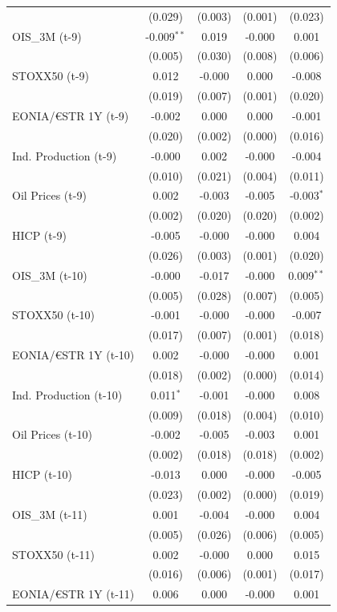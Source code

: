 \begin{longtable}[t]{lcccc}
 & (0.029) & (0.003) & (0.001) & (0.023)\\
OIS\_3M (t-9) & -0.009$^{**}$ & 0.019 & -0.000 & 0.001\\
 & (0.005) & (0.030) & (0.008) & (0.006)\\
STOXX50 (t-9) & 0.012 & -0.000 & 0.000 & -0.008\\
 & (0.019) & (0.007) & (0.001) & (0.020)\\
EONIA/€STR 1Y (t-9) & -0.002 & 0.000 & 0.000 & -0.001\\
 & (0.020) & (0.002) & (0.000) & (0.016)\\
Ind. Production (t-9) & -0.000 & 0.002 & -0.000 & -0.004\\
 & (0.010) & (0.021) & (0.004) & (0.011)\\
Oil Prices (t-9) & 0.002 & -0.003 & -0.005 & -0.003$^{*}$\\
 & (0.002) & (0.020) & (0.020) & (0.002)\\
HICP (t-9) & -0.005 & -0.000 & -0.000 & 0.004\\
 & (0.026) & (0.003) & (0.001) & (0.020)\\
OIS\_3M (t-10) & -0.000 & -0.017 & -0.000 & 0.009$^{**}$\\
 & (0.005) & (0.028) & (0.007) & (0.005)\\
STOXX50 (t-10) & -0.001 & -0.000 & -0.000 & -0.007\\
 & (0.017) & (0.007) & (0.001) & (0.018)\\
EONIA/€STR 1Y (t-10) & 0.002 & -0.000 & -0.000 & 0.001\\
 & (0.018) & (0.002) & (0.000) & (0.014)\\
Ind. Production (t-10) & 0.011$^{*}$ & -0.001 & -0.000 & 0.008\\
 & (0.009) & (0.018) & (0.004) & (0.010)\\
Oil Prices (t-10) & -0.002 & -0.005 & -0.003 & 0.001\\
 & (0.002) & (0.018) & (0.018) & (0.002)\\
HICP (t-10) & -0.013 & 0.000 & -0.000 & -0.005\\
 & (0.023) & (0.002) & (0.000) & (0.019)\\
OIS\_3M (t-11) & 0.001 & -0.004 & -0.000 & 0.004\\
 & (0.005) & (0.026) & (0.006) & (0.005)\\
STOXX50 (t-11) & 0.002 & -0.000 & 0.000 & 0.015\\
 & (0.016) & (0.006) & (0.001) & (0.017)\\
EONIA/€STR 1Y (t-11) & 0.006 & 0.000 & -0.000 & 0.001\\

\end{longtable}
